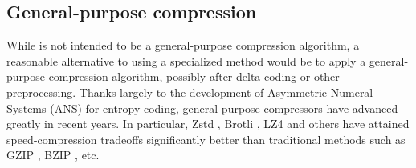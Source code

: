 \subsection{General-purpose compression}
While \mine is not intended to be a general-purpose compression algorithm, a reasonable alternative to using a specialized method would be to apply a general-purpose compression algorithm, possibly after delta coding or other preprocessing. Thanks largely to the development of Asymmetric Numeral Systems (ANS) \cite{ans} for entropy coding, general purpose compressors have advanced greatly in recent years. In particular, Zstd \cite{zstd}, Brotli \cite{brotli}, LZ4 \cite{lz4} and others have attained speed-compression tradeoffs significantly better than traditional methods such as GZIP \cite{gzip}, BZIP \cite{lzo}, etc.
